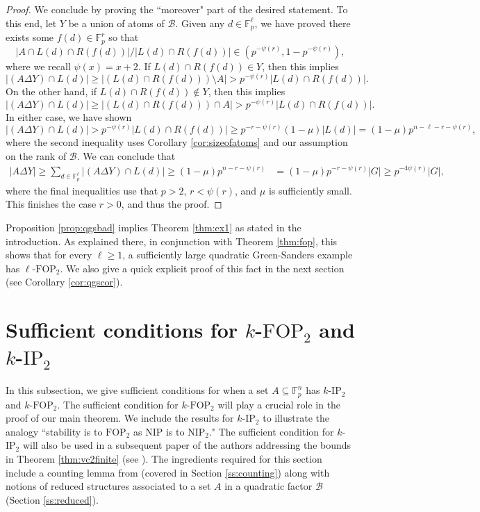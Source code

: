 \documentclass[12pt,oneside,british,a4wide]{amsart}
\numberwithin{equation}{section}
\theoremstyle{definition}
\def\F{\mathbb{F}}
\def\FOP{\mathrm{FOP}}
\def\IP{\mathrm{IP}}
\def\NIP{\mathrm{NIP}}
\newcommand{\calB}{\mathcal{B}}
\begin{document}
\begin{proof}
We conclude by proving the ``moreover" part of the desired statement.  To this end, let $Y$ be a union of atoms of $\calB$.  Given any $d\in \F_p^{\ell}$,  we have proved there exists some $f(d)\in \F_p^r$ so that 
$$
|A\cap L(d)\cap R(f(d))|/|L(d)\cap R(f(d))|\in (p^{-\psi(r)}, 1-p^{-\psi(r)}),
$$
where we recall $\psi(x)=x+2$.  If $L(d)\cap R(f(d))\in Y$, then this implies 
$$
|(A\Delta Y)\cap L(d)|\geq | (L(d)\cap R(f(d)))\setminus A|>p^{-\psi(r)}|L(d)\cap R(f(d))|.
$$
 On the other hand, if $L(d)\cap R(f(d))\notin Y$, then this implies 
$$
|(A\Delta Y)\cap L(d)|\geq | (L(d)\cap R(f(d)))\cap A|> p^{-\psi(r)}|L(d)\cap R(f(d))|.
$$
In either case, we have shown 
$$
|(A\Delta Y)\cap L(d)|>p^{-\psi(r)}|L(d)\cap R(f(d))|\geq p^{-r-\psi(r)}(1-\mu) |L(d)|=(1-\mu)p^{n-\ell-r-\psi(r)},
$$
 where the second inequality uses Corollary \ref{cor:sizeofatoms} and our assumption on the rank of $\calB$.  We can conclude that
\begin{align*}
|A\Delta Y|\geq \sum_{d\in \F_p^{\ell}}|(A\Delta Y)\cap L(d)|\geq (1-\mu)p^{n-r-\psi(r)}&=(1-\mu)p^{-r-\psi(r)}|G|\geq p^{-4\psi(r)}|G|,
\end{align*}
where the final inequalities use that $p>2$, $r<\psi(r)$, and $\mu$ is sufficiently small.  This finishes the case $r>0$, and thus the proof.
\end{proof}

Proposition \ref{prop:qgsbad} implies Theorem \ref{thm:ex1} as stated in the introduction.  As explained there, in conjunction with Theorem \ref{thm:fop}, this shows that for every $\ell \geq 1$, a sufficiently  large quadratic Green-Sanders example has $\ell$-$\FOP_2$.  We also give a quick explicit proof of this fact in the next section (see Corollary \ref{cor:qgscor}).  


\section{Sufficient conditions for $k$-$\FOP_2$ and $k$-$\IP_2$}\label{sec:sufficient}

In this subsection, we give sufficient conditions for when a set $A\subseteq \F_p^n$ has $k$-$\IP_2$ and $k$-$\FOP_2$.  The sufficient condition for $k$-$\FOP_2$ will play a crucial role in the proof of our main theorem.  We include the results for $k$-$\IP_2$ to illustrate the analogy ``stability is to $\FOP_2$ as NIP is to $\NIP_2$."  The sufficient condition for $k$-$\IP_2$ will also be used in a subsequent paper of the authors addressing the bounds in Theorem \ref{thm:vc2finite} (see \cite{Terry.2025}).  The ingredients required for this section include a counting lemma from \cite{Terry.2021d} (covered in Section \ref{ss:counting}) along with notions of reduced structures associated to a set $A$ in a quadratic factor $\calB$ (Section \ref{ss:reduced}).  
\end{document}
